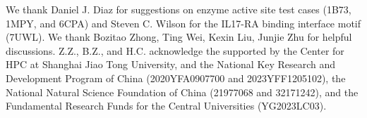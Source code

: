 We thank Daniel J. Diaz for suggestions on enzyme active site test cases (1B73, 1MPY, and 6CPA) and Steven C. Wilson for the IL17-RA binding interface motif (7UWL).
We thank Bozitao Zhong, Ting Wei, Kexin Liu, Junjie Zhu for helpful discussions. Z.Z., B.Z., and H.C. acknowledge the supported by the Center for HPC at Shanghai Jiao Tong University, and the National Key Research and Development Program of China (2020YFA0907700 and 2023YFF1205102), the National Natural Science Foundation of China (21977068 and 32171242), and the Fundamental Research Funds for the Central Universities (YG2023LC03).